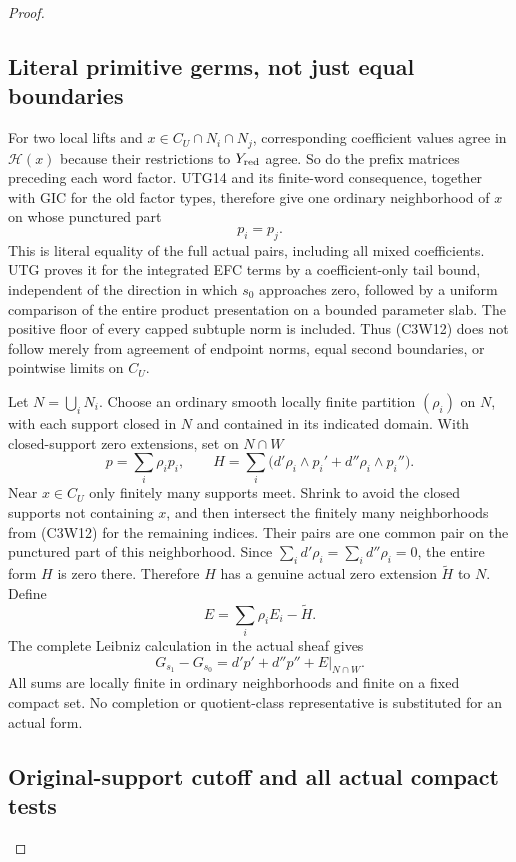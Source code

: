\begin{proof}
\subsection{Literal primitive germs, not just equal boundaries}

For two local lifts and $x\in C_U\cap N_i\cap N_j$, corresponding
coefficient values agree in $\mathscr H(x)$ because their
restrictions to $Y_{\rm red}$ agree.  So do the prefix matrices
preceding each word factor.  UTG14 and its finite-word consequence,
together with GIC for the old factor types, therefore give one
ordinary neighborhood of $x$ on whose punctured part
\[
                              p_i=p_j.
 \tag{C3W12}
\]
This is literal equality of the full actual pairs, including all
mixed coefficients.  UTG proves it for the integrated EFC terms
by a coefficient-only tail bound, independent of the direction
in which $s_0$ approaches zero, followed by a uniform comparison
of the entire product presentation on a bounded parameter slab.
The positive floor of every capped subtuple norm is included.
Thus (C3W12) does not follow merely from agreement of endpoint
norms, equal second boundaries, or pointwise limits on $C_U$.

Let $N=\bigcup_iN_i$.  Choose an ordinary smooth locally finite
partition $(\rho_i)$ on $N$, with each support closed in $N$
and contained in its indicated domain.  With closed-support zero
extensions, set on $N\cap W$
\[
 p=\sum_i\rho_i p_i,\qquad
 H=\sum_i\bigl(d'\rho_i\wedge p_i'
                       +d''\rho_i\wedge p_i''\bigr).
 \tag{C3W13}
\]
Near $x\in C_U$ only finitely many supports meet.  Shrink to avoid
the closed supports not containing $x$, and then intersect the
finitely many neighborhoods from (C3W12) for the remaining
indices.  Their pairs are one common pair on the punctured part
of this neighborhood.  Since $\sum_i d'\rho_i=\sum_i d''\rho_i=0$,
the entire form $H$ is zero there.  Therefore $H$ has a genuine
actual zero extension $\widetilde H$ to $N$.  Define
\[
                    E=\sum_i\rho_iE_i-\widetilde H.
 \tag{C3W14}
\]
The complete Leibniz calculation in the actual sheaf gives
\[
                G_{s_1}-G_{s_0}=d'p'+d''p''+E|_{N\cap W}.
 \tag{C3W15}
\]
All sums are locally finite in ordinary neighborhoods and finite
on a fixed compact set.  No completion or quotient-class
representative is substituted for an actual form.

\subsection{Original-support cutoff and all actual compact tests}


\end{proof}
